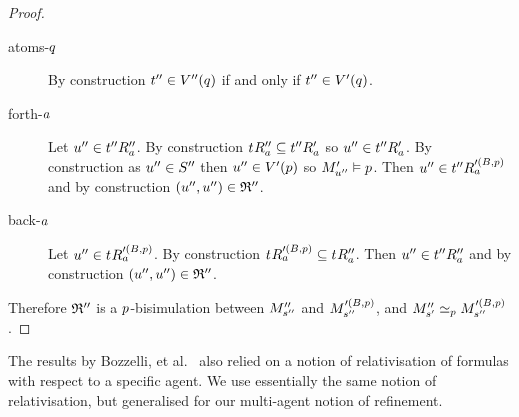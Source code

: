 \begin{proof}
\begin{description}
    \item[atoms-$\atomQ$] 
        By construction $\kStateTPP \in \kValuationPP(\atomQ)$ if and only if $\kStateTPP \in \kValuationP(\atomQ)$.
    \item[forth-$\agentA$]
        Let $\kStateUPP \in \kSuccessorsPPA{\kStateTPP}$.
        By construction $\kSuccessorsPPA{\kStateT} \subseteq \kSuccessorsPA{\kStateTPP}$ so $\kStateUPP \in \kSuccessorsPA{\kStateTPP}$.
        By construction as $\kStateUPP \in \kStatesPP$ then $\kStateUPP \in \kValuationP(\atomP)$ so $\kPModelP{\kStateUPP} \entails \atomP$.
        Then $\kStateUPP \in \kSuccessorsA[\prime(\agentsB, \atomP)]{\kStateTPP}$ and by construction $(\kStateUPP, \kStateUPP) \in \bisimulation''$.
    \item[back-$\agentA$]
        Let $\kStateUPP \in \kSuccessorsA[\prime(\agentsB, \atomP)]{\kStateT}$.
        By construction $\kSuccessorsA[\prime(\agentsB, \atomP)]{\kStateT} \subseteq \kSuccessorsPPA{\kStateT}$.
        Then $\kStateUPP \in \kSuccessorsPPA{\kStateTPP}$ and by construction $(\kStateUPP, \kStateUPP) \in \bisimulation''$.
\end{description}

Therefore $\bisimulation''$ is a $\atomP$-bisimulation between $\kPModelPP{\kStateSPP}$ and $\kPModel[\prime(\agentsB, \atomP)]{\kStateSPP}$, and $\kPModelPP{\kStateSP} \bisimilar[\atomP] \kPModel[\prime(\agentsB, \atomP)]{\kStateSPP}$.
\end{proof}

The results by Bozzelli, et al.~\cite{bozzelli:2014b} also relied on a notion of relativisation of \langBqml{} formulas with respect to a specific agent.
We use essentially the same notion of relativisation, but generalised for our multi-agent notion of refinement.

